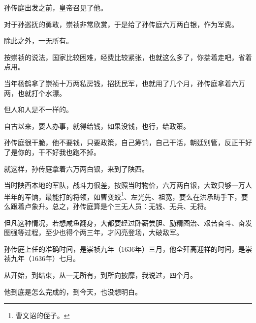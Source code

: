 \begin{multicols}{\theparacolNo}
		孙传庭出发之前，皇帝召见了他。

		对于孙巡抚的勇敢，崇祯非常欣赏，于是给了孙传庭六万两白银，作为军费。

		除此之外，一无所有。

		按崇祯的说法，国家比较困难，经费比较紧张，也就这么多了，你揣着走吧，省着点用。

		当年杨鹤拿了崇祯十万两私房钱，招抚民军，也就用了几个月，孙传庭拿着六万两，也就打个水漂。

		但人和人是不一样的。

		自古以来，要人办事，就得给钱，如果没钱，也行，给政策。

		孙传庭很干脆，他不要钱，只要政策，自己筹饷，自己干活，朝廷别管，反正干好了是你的，干不好我也跑不掉。

		就这样，孙传庭拿着六万两白银，来到了陕西。

		当时陕西本地的军队，战斗力很差，按照当时物价，六万两白银，大致只够一万人半年的军饷，最能打的将领，如曹变蛟\footnote{曹文诏的侄子。}、左光先、祖宽，要么在洪承畴手下，要么跟着卢象升。总之，孙传庭算是个三无人员：无钱、无兵、无将。

		但凡这种情况，若想咸鱼翻身，大都要经过卧薪尝胆、励精图治、艰苦奋斗、奋发图强等过程，至少也得个两三年，才闪亮登场，大破敌军。

		孙传庭上任的准确时间，是崇祯九年（1636年）三月，他全歼高迎祥的时间，是崇祯九年（1636年）七月。

		从开始，到结束，从一无所有，到所向披靡，我说过，四个月。

		他到底是怎么完成的，到今天，也没想明白。
		\ifnum{}
	\end{multicols}
\fi
\newpage
